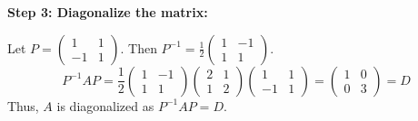 \textbf{Step 3: Diagonalize the matrix:}

Let \(P = \begin{pmatrix} 1 & 1 \\ -1 & 1 \end{pmatrix}\). Then \(P^{-1} = \frac{1}{2} \begin{pmatrix} 1 & -1 \\ 1 & 1 \end{pmatrix}\).
    \[
    P^{-1}AP = \frac{1}{2} \begin{pmatrix} 1 & -1 \\ 1 & 1 \end{pmatrix} \begin{pmatrix} 2 & 1 \\ 1 & 2 \end{pmatrix} \begin{pmatrix} 1 & 1 \\ -1 & 1 \end{pmatrix} = \begin{pmatrix} 1 & 0 \\ 0 & 3 \end{pmatrix} = D
    \]
    Thus, \(A\) is diagonalized as \(P^{-1}AP = D\).
